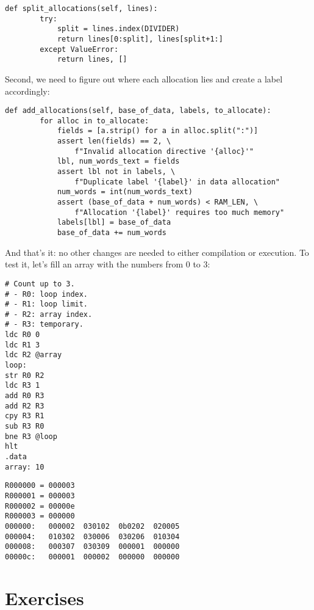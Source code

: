 \documentclass{scrbook}
\begin{document}
\begin{lstlisting}[frame=single,frameround=tttt]
    def split_allocations(self, lines):
        try:
            split = lines.index(DIVIDER)
            return lines[0:split], lines[split+1:]
        except ValueError:
            return lines, []
\end{lstlisting}



Second,
we need to figure out where each allocation lies and create a label accordingly:


\begin{lstlisting}[frame=single,frameround=tttt]
    def add_allocations(self, base_of_data, labels, to_allocate):
        for alloc in to_allocate:
            fields = [a.strip() for a in alloc.split(":")]
            assert len(fields) == 2, \
                f"Invalid allocation directive '{alloc}'"
            lbl, num_words_text = fields
            assert lbl not in labels, \
                f"Duplicate label '{label}' in data allocation"
            num_words = int(num_words_text)
            assert (base_of_data + num_words) < RAM_LEN, \
                f"Allocation '{label}' requires too much memory"
            labels[lbl] = base_of_data
            base_of_data += num_words
\end{lstlisting}



And that's it:
no other changes are needed to either compilation or execution.
To test it,
let's fill an array with the numbers from 0 to 3:


\begin{lstlisting}[frame=single,frameround=tttt]
# Count up to 3.
# - R0: loop index.
# - R1: loop limit.
# - R2: array index.
# - R3: temporary.
ldc R0 0
ldc R1 3
ldc R2 @array
loop:
str R0 R2
ldc R3 1
add R0 R3
add R2 R3
cpy R3 R1
sub R3 R0
bne R3 @loop
hlt
.data
array: 10
\end{lstlisting}



\begin{lstlisting}[frame=single,frameround=tttt]
R000000 = 000003
R000001 = 000003
R000002 = 00000e
R000003 = 000000
000000:   000002  030102  0b0202  020005
000004:   010302  030006  030206  010304
000008:   000307  030309  000001  000000
00000c:   000001  000002  000000  000000
\end{lstlisting}



\section{Exercises}\label{vm-exercises}
\end{document}

